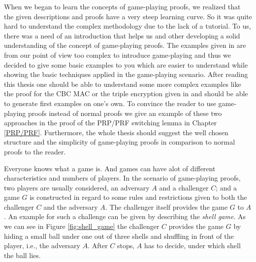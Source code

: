 When we began to learn the concepts of game-playing proofs, we realized that the given descriptions and proofs have a very steep learning curve.
So it was quite hard to understand the complex methodology due to the lack of a tutorial. To us, there was a need of an introduction
that helps us and other developing a solid understanding of the concept of game-playing proofs. The examples given in \cite{DBLP:conf/eurocrypt/BellareR06}
are from our point of view too complex to introduce game-playing and thus we decided to give some basic examples to you which are easier to understand
while showing the basic techniques applied in the game-playing scenario. After reading this thesis one should be able to understand
some more complex examples like the proof for the CBC MAC or the triple encryption given in \cite{DBLP:conf/eurocrypt/BellareR06} and
should be able to generate first examples on one's own. To convince the reader to use game-playing proofs instead of normal proofs we give an example
of these two approaches in the proof of the PRP/PRF switching lemma in Chapter \ref{PRP/PRF}. Furthermore, the whole thesis should suggest the
well chosen structure and the simplicity of game-playing proofs in comparison to normal proofs to the reader.

Everyone knows what a game is. And games can have alot of different characteristics and numbers of players. In the scenario of game-playing proofs,
two players are usually considered, an adversary $A$ and a challenger $C$; and a game $G$ is constructed in regard to some rules and restrictions given
to both the challenger $C$ and the adversary $A$. The challenger itself provides the game $G$ to $A$. An example for such a challenge can be given by
describing the \textit{shell game}. As we can see in Figure \ref{fig:shell_game} the challenger $C$ provides the game $G$ by hiding a small ball under one out of
three shells and shuffling in front of the player, i.e., the adversary $A$. After $C$ stops, $A$ has to decide, under which shell the ball lies.


